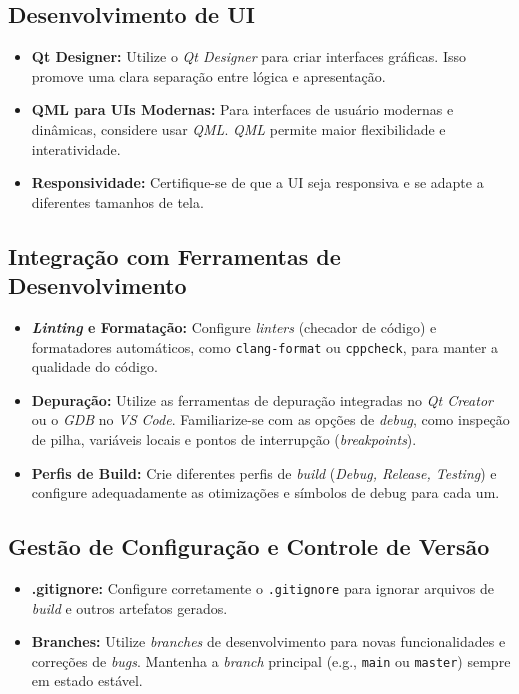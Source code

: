 \documentclass[a4paper,11pt]{article}
\newcommand{\build}{\textit{build}}
\newcommand{\qtcreator}{\textit{Qt Creator}}
\newcommand{\qtdesigner}{\textit{Qt Designer}}
\newcommand{\vscode}{\textit{VS Code}}
\begin{document}
\subsection{Desenvolvimento de UI}
\begin{itemize}
	\item \textbf{Qt Designer:} Utilize o \qtdesigner{} para criar interfaces gráficas. Isso promove uma clara separação entre lógica e apresentação.
	
	\item \textbf{QML para UIs Modernas:} Para interfaces de usuário modernas e dinâmicas, considere usar \textit{QML}. \textit{QML} permite maior flexibilidade e interatividade.
	
	\item \textbf{Responsividade:} Certifique-se de que a UI seja responsiva e se adapte a diferentes tamanhos de tela.
\end{itemize}

\subsection{Integração com Ferramentas de Desenvolvimento}
\begin{itemize}
	\item \textbf{\textit{Linting} e Formatação:} Configure \textit{linters} (checador de código) e formatadores automáticos, como \texttt{clang-format} ou \texttt{cppcheck}, para manter a qualidade do código.
	
	\item \textbf{Depuração:} Utilize as ferramentas de depuração integradas no \qtcreator{} ou o \textit{GDB} no \vscode{}. Familiarize-se com as opções de \textit{debug}, como inspeção de pilha, variáveis locais e pontos de interrupção (\textit{breakpoints}).
	
	\item \textbf{Perfis de Build:} Crie diferentes perfis de \build{} (\textit{Debug, Release, Testing}) e configure adequadamente as otimizações e símbolos de debug para cada um.
\end{itemize}

\subsection{Gestão de Configuração e Controle de Versão}
\begin{itemize}
	\item \textbf{.gitignore:} Configure corretamente o \texttt{.gitignore} para ignorar arquivos de \build{} e outros artefatos gerados.
	
	\item \textbf{Branches:} Utilize \textit{branches} de desenvolvimento para novas funcionalidades e correções de \textit{bugs}. Mantenha a \textit{branch} principal (e.g., \texttt{main} ou \texttt{master}) sempre em estado estável.
	
\end{itemize}
\end{document}
